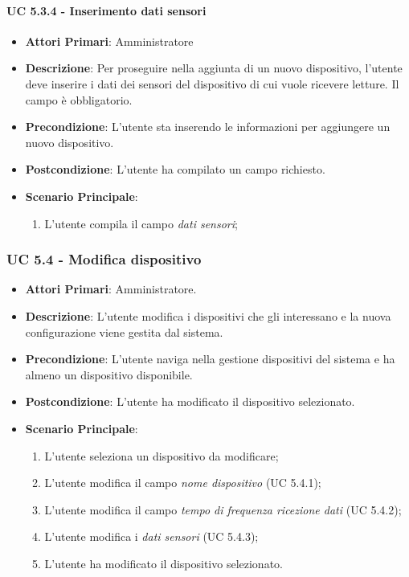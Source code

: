 				\paragraph{UC 5.3.4 - Inserimento dati sensori}
				\begin{itemize}
					\item \textbf{Attori Primari}: Amministratore
					\item \textbf{Descrizione}: Per proseguire nella aggiunta di un nuovo dispositivo, l'utente deve inserire i dati dei sensori del dispositivo di cui vuole ricevere letture. Il campo è obbligatorio.
					\item \textbf{Precondizione}: L'utente sta inserendo le informazioni per aggiungere un nuovo dispositivo.
					\item \textbf{Postcondizione}: L'utente ha compilato un campo richiesto.
					\item \textbf{Scenario Principale}:
					\begin{enumerate}
						\item{L'utente compila il campo \textit{dati sensori};}
					\end{enumerate}
				\end{itemize}

			
			\subsubsection{UC 5.4 - Modifica dispositivo}
			\begin{itemize}
				\item \textbf{Attori Primari}: Amministratore.
				\item \textbf{Descrizione}: L'utente modifica i dispositivi che gli interessano e la nuova configurazione viene gestita dal sistema.
				\item \textbf{Precondizione}: L'utente naviga nella gestione dispositivi del sistema e ha almeno un dispositivo disponibile.
				\item \textbf{Postcondizione}: L'utente ha modificato il dispositivo selezionato.
				\item \textbf{Scenario Principale}:
				\begin{enumerate}
					\item{L'utente seleziona un dispositivo da modificare;}
					\item{L'utente modifica il campo \textit{nome dispositivo} (UC 5.4.1);}
					\item{L'utente modifica il campo \textit{tempo di frequenza ricezione dati} (UC 5.4.2);}
					\item{L'utente modifica i \textit{dati sensori} (UC 5.4.3);}
					\item{L'utente ha modificato il dispositivo selezionato.}
				\end{enumerate}
			\end{itemize}

